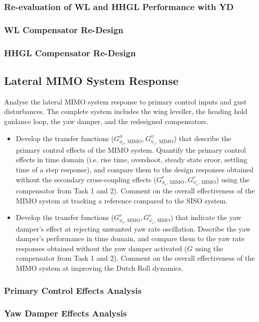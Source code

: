 \subsubsection{Re-evaluation of WL and HHGL Performance with YD}

\subsubsection{WL Compensator Re-Design}

\subsubsection{HHGL Compensator Re-Design}

\subsection{Lateral MIMO System Response}

Analyse the lateral MIMO system response to primary control inputs and gust disturbances. The complete system includes the wing leveller, the heading hold guidance loop, the yaw damper, and the redesigned compensators.
\begin{itemize}
\item Develop the transfer functions ($G^{\phi}_{\phi_{c} \text{, MIMO}}, G^{\psi}_{\psi_{c} \text{, MIMO}}$) that describe the primary control effects of the MIMO system. Quantify the primary control effects in time domain (i.e. rise time, overshoot, steady state eroor, settling time of a step response), and compare them to the design responses obtained without the
secondary cross-coupling effects ($G^{r}_{\phi_{c} \text{, MIMO}}, G^{r}_{\psi_{c} \text{, MIMO}}$) using the compensator from Task 1 and 2). Comment on the overall effectiveness of the MIMO system at tracking a reference compared to the SISO system.
\item Develop the transfer functions ($G^{r}_{\phi_{c} \text{, SIMO}}, G^{r}_{\psi_{c} \text{, SIMO}}$) that indicate the yaw damper’s effect at rejecting unwanted yaw rate oscillation. Describe the yaw damper’s performance in time domain, and compare them to the yaw rate responses obtained without the yaw damper activated ($G$  using the compensator from Task 1 and 2). Comment on the overall effectiveness of the MIMO system at improving the Dutch Roll dynamics.
\end{itemize}
\subsubsection{Primary Control Effects Analysis}

\subsubsection{Yaw Damper Effects Analysis}